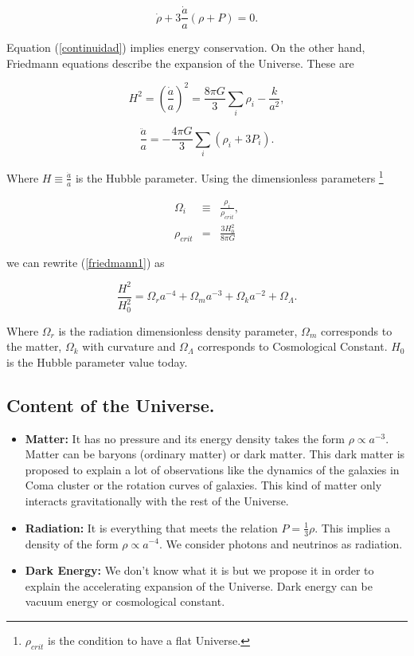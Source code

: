 \documentclass[onecolumn,           %
               showpacs,            %
               preprintnumbers,     %
               aps,                 %
               prl,          	    %
               letterpaper,             %
               superscriptaddress,      %
               nofootinbib,         %
               tightenlines,        %
               floats,floatfix      %
               ,usenatbib,
               ]{revtex4-1}
\begin{document}
\begin{equation}
\label{continuidad}
\dot{\rho} + 3 \frac{\dot{a}}{a} \left(\rho + P\right) = 0.
\end{equation}

Equation (\ref{continuidad}) implies energy conservation. On the other hand, Friedmann equations describe the expansion of the Universe. These are

\begin{equation}
\label{friedmann1}
H^2 = \left(\frac{\dot{a}}{a}\right)^2 = \frac{8 \pi G}{3} \sum_{i}\rho_{i} - \frac{k}{a^2} ,
\end{equation}

\begin{equation}
\frac{\ddot{a}}{a} = -\frac{4 \pi G}{3} \sum_{i}\left(\rho_i + 3P_i\right) .
\end{equation}

Where $H \equiv \frac{\dot{a}}{a}$ is the Hubble parameter. Using the dimensionless parameters \footnote{$\rho_{crit}$ is the condition to have a flat Universe.}

\begin{eqnarray}
\Omega_{i} &\equiv& \frac{\rho_i}{\rho_{crit}},\\
\rho_{crit} &=& \frac{3H_0^2}{8 \pi G}
\end{eqnarray} 

we can rewrite (\ref{friedmann1}) as

\begin{equation}
\frac{H^2}{H_0^2} = \Omega_r a^{-4} + \Omega_m a^{-3} + \Omega_k a^{-2} + \Omega_{\Lambda} .
\end{equation}

Where $\Omega_r$ is the radiation dimensionless density parameter, $\Omega_m$ corresponds to the matter, $\Omega_k$ with curvature and $\Omega_{\Lambda}$ corresponds to Cosmological Constant. $H_0$ is the Hubble parameter value today.

\subsection{Content of the Universe.}

\begin{itemize}
	\item \textbf{Matter:} It has no pressure and its energy density takes the form $\rho \propto a^{-3}.$ Matter can be baryons (ordinary matter) or dark matter. This dark matter is proposed to explain a lot of observations like the dynamics of the galaxies in Coma cluster or the rotation curves of galaxies. This kind of matter only interacts gravitationally with the rest of the Universe.
	\item \textbf{Radiation:} It is everything that meets the relation $P = \frac{1}{3} \rho$. This implies a density of the form $\rho \propto a^{-4}$. We consider photons and neutrinos as radiation.
	\item \textbf{Dark Energy:} We don't know what it is but we propose it in order to explain the accelerating expansion of the Universe. Dark energy can be vacuum energy or cosmological constant.
\end{itemize}
\end{document}
